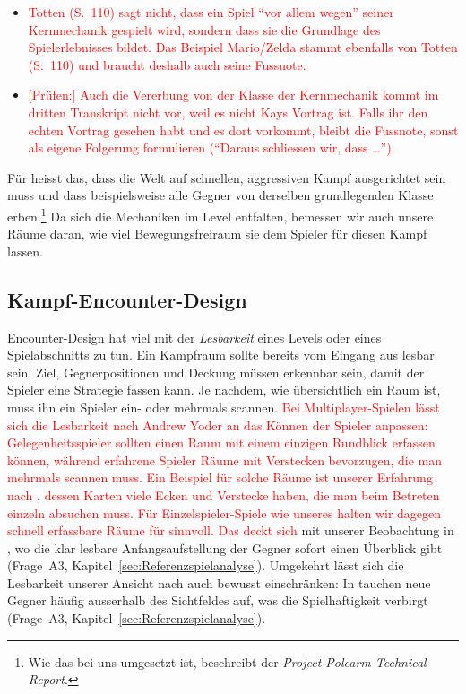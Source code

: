 \documentclass[../Main.tex]{subfiles}
\begin{document}
\begin{itemize}[leftmargin=1.5cm]
    \item \textcolor{red}{Totten (S.~110) sagt nicht, dass ein Spiel \enquote{vor allem wegen} seiner Kernmechanik gespielt wird, sondern dass sie die Grundlage des Spielerlebnisses bildet. Das Beispiel Mario/Zelda stammt ebenfalls von Totten (S.~110) und braucht deshalb auch seine Fussnote.}
    \item \textcolor{red}{[Prüfen:] Auch die Vererbung von der Klasse der Kernmechanik kommt im dritten Transkript nicht vor, weil es nicht Kays Vortrag ist. Falls ihr den echten Vortrag gesehen habt und es dort vorkommt, bleibt die Fussnote, sonst als eigene Folgerung formulieren (\enquote{Daraus schliessen wir, dass \ldots}).}
\end{itemize}

Für  heisst das, dass die Welt auf schnellen, aggressiven Kampf ausgerichtet sein muss und dass beispielsweise alle Gegner von derselben grundlegenden Klasse erben.\footnote{Wie das bei uns umgesetzt ist, beschreibt der \textit{Project Polearm Technical Report}.} Da sich die Mechaniken im Level entfalten, bemessen wir auch unsere Räume daran, wie viel Bewegungsfreiraum sie dem Spieler für diesen Kampf lassen.

\subsection{Kampf-Encounter-Design} \label{sec:Encounter}
Encounter-Design hat viel mit der \textit{Lesbarkeit} eines Levels oder eines Spielabschnitts zu tun. Ein Kampfraum sollte bereits vom Eingang aus lesbar sein: Ziel, Gegnerpositionen und Deckung müssen erkennbar sein, damit der Spieler eine Strategie fassen kann.\autocite{gdc_horizonquests2018} Je nachdem, wie übersichtlich ein Raum ist, muss ihn ein Spieler ein- oder mehrmals scannen. \textcolor{red}{Bei Multiplayer-Spielen lässt sich die Lesbarkeit nach Andrew Yoder an das Können der Spieler anpassen: Gelegenheitsspieler sollten einen Raum mit einem einzigen Rundblick erfassen können, während erfahrene Spieler Räume mit Verstecken bevorzugen, die man mehrmals scannen muss.}\autocite[122--123]{totten2014architectural} \textcolor{red}{Ein Beispiel für solche Räume ist unserer Erfahrung nach} ,\autocite{valve_counterstrike_2000} \textcolor{red}{dessen Karten viele Ecken und Verstecke haben, die man beim Betreten einzeln absuchen muss. Für Einzelspieler-Spiele wie unseres halten wir dagegen schnell erfassbare Räume für sinnvoll. Das deckt sich} mit unserer Beobachtung in , wo die klar lesbare Anfangsaufstellung der Gegner sofort einen Überblick gibt (Frage~A3, Kapitel~\ref{sec:Referenzspielanalyse}). Umgekehrt lässt sich die Lesbarkeit unserer Ansicht nach auch bewusst einschränken: In  tauchen neue Gegner häufig ausserhalb des Sichtfeldes auf, was die Spielhaftigkeit verbirgt (Frage~A3, Kapitel~\ref{sec:Referenzspielanalyse}).
\end{document}

